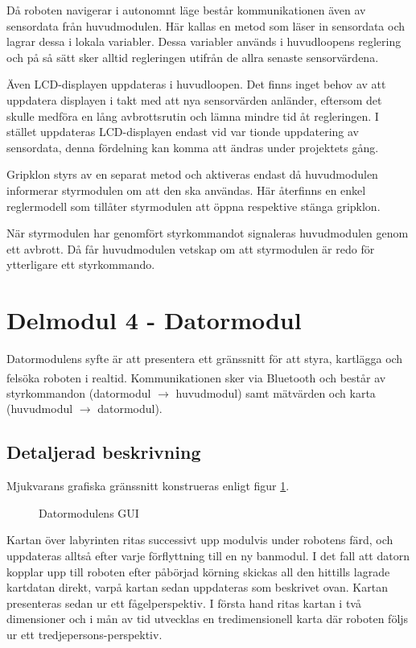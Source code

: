 \documentclass[11pt]{article}
\begin{document}
\begin{flushleft}
Då roboten navigerar i autonomnt läge består kommunikationen även av sensordata från huvudmodulen. Här kallas en metod som läser in sensordata och lagrar dessa i lokala variabler. Dessa variabler används i huvudloopens reglering och på så sätt sker alltid regleringen utifrån de allra senaste sensorvärdena. 

Även LCD-displayen uppdateras i huvudloopen. Det finns inget behov av att uppdatera displayen i takt med att nya sensorvärden anländer, eftersom det skulle medföra en lång avbrottsrutin och lämna mindre tid åt regleringen. I stället uppdateras LCD-displayen endast vid var tionde uppdatering av sensordata, denna fördelning kan komma att ändras under projektets gång. 

Gripklon styrs av en separat metod och aktiveras endast då huvudmodulen informerar styrmodulen om att den ska användas. Här återfinns en enkel reglermodell som tillåter styrmodulen att öppna respektive stänga gripklon. 

När styrmodulen har genomfört styrkommandot signaleras huvudmodulen genom ett avbrott. Då får huvudmodulen vetskap om att styrmodulen är redo för ytterligare ett styrkommando. 

\pagebreak
\section{Delmodul 4 - Datormodul}
Datormodulens syfte är att presentera ett gränssnitt för att styra, kartlägga och felsöka roboten i realtid. Kommunikationen sker via Bluetooth\textsuperscript{\circledR} och består av styrkommandon (datormodul $\rightarrow$ huvudmodul) samt mätvärden och karta (huvudmodul $\rightarrow$ datormodul). 

\subsection{Detaljerad beskrivning}
Mjukvarans grafiska gränssnitt konstrueras enligt figur \ref{datormodul:software}.

\begin{figure}[htbp]
\centering
\noindent\resizebox{.5\linewidth}{!}{
	}
	\caption{Datormodulens GUI \label{datormodul:software}}	
\end{figure}

Kartan över labyrinten ritas successivt upp modulvis under robotens färd, och uppdateras alltså efter varje förflyttning till en ny banmodul. I det fall att datorn kopplar upp till roboten efter påbörjad körning skickas all den hittills lagrade kartdatan direkt, varpå kartan sedan uppdateras som beskrivet ovan. Kartan presenteras sedan ur ett fågelperspektiv. I första hand ritas kartan i två dimensioner och i mån av tid utvecklas en tredimensionell karta där roboten följs ur ett tredjepersons-perspektiv. 


\end{flushleft}
\end{document}

